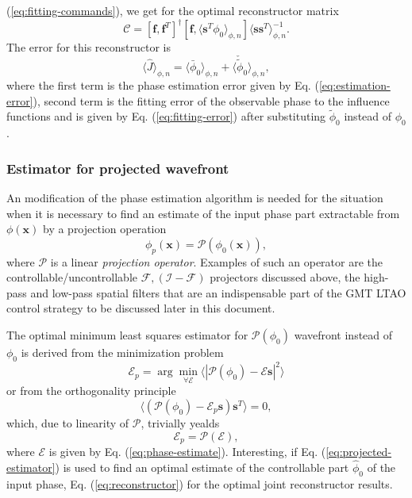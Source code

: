 (\ref{eq:fitting-commands}), we get for the optimal reconstructor matrix
\begin{equation} \label{eq:reconstructor}
	\mathcal{C} = [\bm{f},\bm{f}^{T}]^{\dagger}
	              [\bm{f}, \langle \bm{s}^{T} \phi_{0} \rangle_{\phi,n} ]
	              \langle \bm{s} \bm{s}^{T} \rangle_{\phi,n}^{-1}.
\end{equation}
The error for this reconstructor is
\begin{equation} \label{eq:reconstruction-error}
	\langle \hat{J} \rangle_{\phi,n} =
	\langle \bar{\phi}_{0} \rangle_{\phi,n} +
	\langle \check{\tilde{\phi}}_{0} \rangle_{\phi,n},
\end{equation}
where the first term is the phase estimation error given by Eq.
(\ref{eq:estimation-error}), second term is the fitting error of the
observable phase to the influence functions and is given by Eq.
(\ref{eq:fitting-error}) after substituting $\tilde{\phi}_{0}$ instead of
$\phi_{0}$.

\subsubsection{Estimator for projected wavefront}

An modification of the phase estimation algorithm is needed for the situation
when it is necessary to find an estimate of the input phase part extractable
from $\phi(\bm{x})$ by a projection operation
\begin{equation} \label{eq:projection}
	\phi_{p}(\bm{x}) = \mathcal{P} ( \phi_{0} (\bm{x}) ),
\end{equation}
where $\mathcal{P}$ is a linear \emph{projection operator}.  Examples of such an operator are the controllable/uncontrollable
$\mathcal{F,(I-F)}$
projectors discussed above, the high-pass and low-pass spatial filters that
are an indispensable part of the GMT LTAO control strategy to be discussed later
in this document.

The optimal minimum least squares estimator for
$\mathcal{P} (\phi_{0})$  wavefront
instead of $\phi_{0}$ is derived from the minimization problem
\begin{equation} \label{eq:projected-estimation}
	\mathcal{E}_{p} = \arg \min_{\forall \mathcal{E}}
	                  \langle |\mathcal{P} (\phi_{0}) -
	                           \mathcal{E} \bm{s}|^{2} \rangle
\end{equation}
or from the orthogonality principle
\begin{equation} \label{eq:projected-estimator-orthogonality-principle}
	\langle (\mathcal{P} (\phi_{0}) -
	         \mathcal{E}_{p} \bm{s}) \bm{s}^{T} \rangle = 0,
\end{equation}
which, due to linearity of $\mathcal{P}$, trivially yealds
\begin{equation} \label{eq:projected-estimator}
	\mathcal{E}_{p} = \mathcal{P(E)},
\end{equation}
where $\mathcal{E}$ is given by Eq. (\ref{eq:phase-estimate}). Interesting,
if Eq. (\ref{eq:projected-estimator}) is used to find an optimal estimate
of the controllable part $\hat{\phi}_{0}$ of the input phase, Eq.
(\ref{eq:reconstructor}) for the optimal joint reconstructor results.


